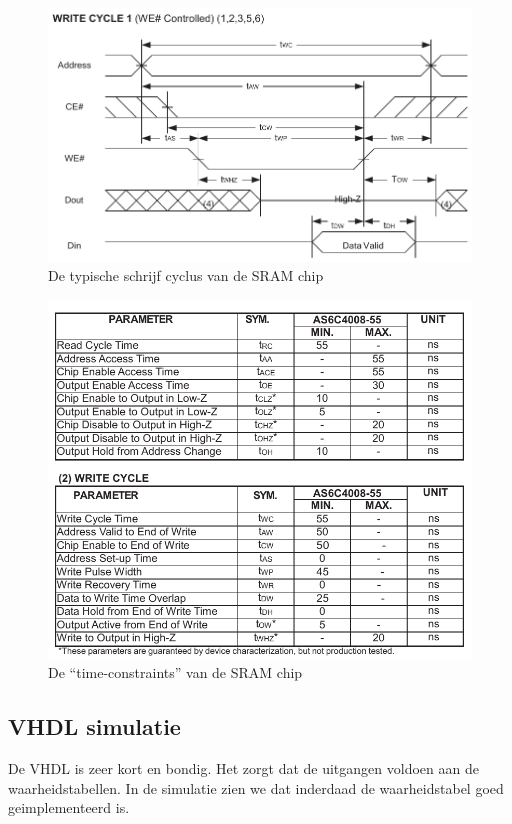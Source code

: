 \documentclass{scrreprt} %
\begin{document}
\begin{figure}[H]
\centering
	\includegraphics[width=\textwidth]{resources/write_cycle-rc.pdf}
	\caption{De typische schrijf cyclus van de SRAM chip \cite{ram-datasheet}}
	\label{fig:ramcontroller-write-cycle}
\end{figure}

\begin{figure}[H]
\centering
	\includegraphics[width=\textwidth]{resources/time_constraints-rc.pdf}
	\caption{De “time-constraints” van de SRAM chip \cite{ram-datasheet}}
	\label{fig:ramcontroller-time-constraints}
\end{figure}

\subsection{VHDL simulatie}
De VHDL is zeer kort en bondig. Het zorgt dat de uitgangen voldoen aan de waarheidstabellen.
In de simulatie zien we dat inderdaad de waarheidstabel goed geimplementeerd is.
\end{document}
